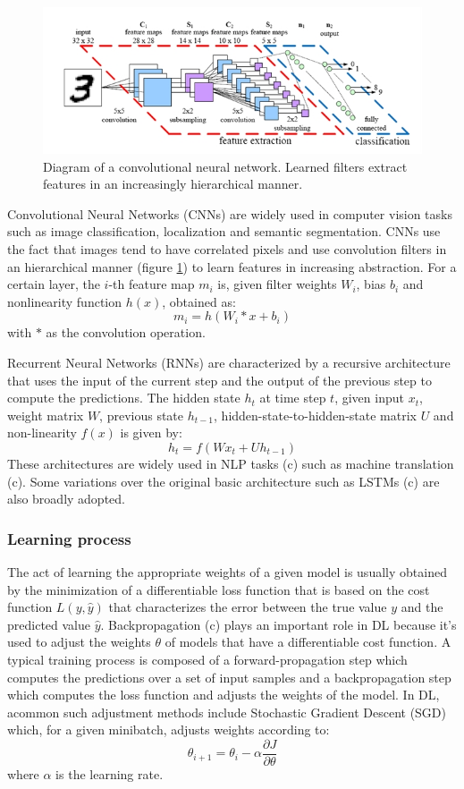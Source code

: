 \documentclass[article]{IEEEtran}
\begin{document}
\begin{figure}
\begin{center}
    \includegraphics[width=1.0\linewidth]{./img/cnn.png}
\caption{
    Diagram of a convolutional neural network.
    Learned filters extract features in an increasingly hierarchical manner.
}
\label{fig:cnn}
\end{center}
\end{figure}

Convolutional Neural Networks (CNNs) are widely used
in computer vision
tasks such as image classification, localization and semantic segmentation.
CNNs use the fact that images tend to have correlated pixels and use
convolution filters in an hierarchical manner (figure \ref{fig:cnn})
to learn features in increasing abstraction.
For a certain layer, the $i$-th feature map $m_i$ is,
given filter weights $W_i$, bias $b_i$ and nonlinearity function $h(x)$,
obtained as:
$$m_i = h\left(W_i * x + b_i\right)$$
with $*$ as the convolution operation.

Recurrent Neural Networks (RNNs) are characterized by a recursive architecture
that uses the input of the current step and the output of the previous
step to compute the predictions.
The hidden state $h_t$ at time step $t$, given input $x_t$, weight matrix $W$,
previous state $h_{t-1}$, hidden-state-to-hidden-state matrix $U$ and
non-linearity $f(x)$ is given by:
$$h_t = f\left(Wx_t + Uh_{t-1}\right)$$
These architectures are widely used in NLP tasks (c) such as
machine translation (c).
Some variations over the original basic architecture such as
LSTMs (c) are also broadly adopted.

\subsubsection{Learning process}
The act of learning the appropriate weights of a given model
is usually obtained by the minimization of a differentiable loss function
that is based on the cost function $L(y, \hat{y})$ that characterizes the error
between the true value $y$ and the predicted value $\hat{y}$.
Backpropagation (c) plays an important role in DL because it's used
to adjust the weights $\theta$ of models that have a
differentiable cost function.
A typical training process is composed of a forward-propagation
step which computes the predictions over a set of input samples
and a backpropagation step which computes the loss function
and adjusts the weights of the model.
In DL, acommon such adjustment methods include Stochastic Gradient Descent (SGD)
which, for a given minibatch, adjusts weights according to:
$$\theta_{i+1} = \theta_i - \alpha\frac{\partial{J}}{\partial{\theta}}$$
where $\alpha$ is the learning rate.
\end{document}
